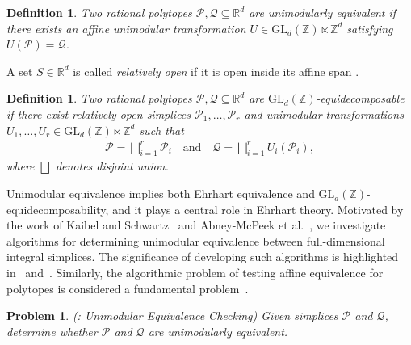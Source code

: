 \documentclass[reqno, 12pt]{article}
\theoremstyle{mydefinition}
\newtheorem{dfn}[thm]{Definition}
\theoremstyle{myremark}
\newtheorem{prob}[thm]{Problem}
\numberwithin{algorithm}{section}
\begin{document}
\begin{dfn}
Two rational polytopes $\mathcal{P}, \mathcal{Q}\subseteq \mathbb{R}^d$ are \emph{unimodularly equivalent} if there exists an affine unimodular transformation $U\in \mathrm{GL}_d(\mathbb{Z})\ltimes \mathbb{Z}^d$ satisfying $U(\mathcal{P})=\mathcal{Q}$.
\end{dfn}




A set $S\in \mathbb{R}^d$ is called \emph{relatively open} if it is open inside its affine span \cite{Erbe-Haase-Santos}.

\begin{dfn}
Two rational polytopes $\mathcal{P}, \mathcal{Q} \subseteq \mathbb{R}^d$ are \emph{$\mathrm{GL}_d(\mathbb{Z})$-equidecomposable} if there exist relatively open simplices $\mathcal{P}_1,\ldots,\mathcal{P}_r$ and unimodular transformations $U_1,\ldots,U_r \in \mathrm{GL}_d(\mathbb{Z}) \ltimes \mathbb{Z}^d$ such that
\begin{align*}
\mathcal{P} = \bigsqcup_{i=1}^r \mathcal{P}_i \quad \text{and} \quad \mathcal{Q} = \bigsqcup_{i=1}^r U_i(\mathcal{P}_i),
\end{align*}
where $\bigsqcup$ denotes disjoint union.
\end{dfn}

Unimodular equivalence implies both Ehrhart equivalence and $\mathrm{GL}_d(\mathbb{Z})$-equidecomposability, and it plays a central role in Ehrhart theory. Motivated by the work of Kaibel and Schwartz~\cite{Kaibel} and Abney-McPeek et al.~\cite{Abney-Mcpeek}, we investigate algorithms for determining unimodular equivalence between full-dimensional integral simplices. The significance of developing such algorithms is highlighted in~\cite[Problem~2]{Gribanov} and~\cite{Kaibel}. Similarly, the algorithmic problem of testing affine equivalence for polytopes is considered a fundamental problem~\cite[Section~4: Problems~19--23]{Kaibel-Pfetsch}.

\begin{prob}{\em (\cite[Problem~2]{Gribanov}: Unimodular Equivalence Checking)}
Given simplices $\mathcal{P}$ and $\mathcal{Q}$, determine whether $\mathcal{P}$ and $\mathcal{Q}$ are unimodularly equivalent.
\end{prob}
\end{document}
